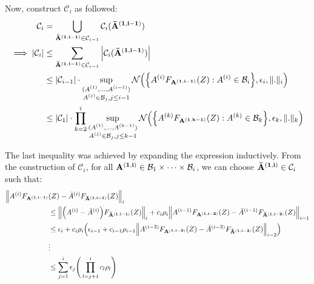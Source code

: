 \begin{proof*}
    \noindent Now, construct $\mathcal{C}_i$ as followed:
    \begin{align*}
        \mathcal{C}_i 
            &= \bigcup_{{\bf {\bar A}^{(1, i-1)}}\in\mathcal{C}_{i-1}} \mathcal{C}_i({\bf {\bar A}^{(1, i-1)}}) \\
        \implies
        |\mathcal{C}_i| 
            &\le \sum_{{\bf {\bar A}^{(1, i-1)}}\in\mathcal{C}_{i-1}} \Big| \mathcal{C}_i({\bf {\bar A}^{(1, i-1)}}) \Big| \\
            &\le |\mathcal{C}_{i-1}| \cdot \sup_{
                \substack{
                    (A^{(1)}, \dots, A^{(i-1)})\\
                    A^{(j)}\in\mathcal{B}_j, j \le i-1
                }
            } \mathcal{N}\Big( 
                \Big\{ 
                    A^{(i)}F_{\bf A^{(1, i-1)}}(Z) : A^{(i)} \in \mathcal{B}_i
                 \Big\}, \epsilon_i, \|.\|_i
             \Big) \\
            &\le |\mathcal{C}_1|\cdot \prod_{k=2}^i \sup_{
                \substack{
                    (A^{(1)}, \dots, A^{(k-1)})\\
                    A^{(j)}\in\mathcal{B}_j, j \le k-1
                }
            } \mathcal{N}\Big( 
                \Big\{ 
                    A^{(k)}F_{\bf A^{(1, k-1)}}(Z) : A^{(k)} \in \mathcal{B}_k
                 \Big\}, \epsilon_k, \|.\|_k
             \Big)
    \end{align*}

    \noindent The last inequality was achieved by expanding the expression inductively. From the construction of $\mathcal{C}_i$, for all ${\bf A^{(1, i)}}\in\mathcal{B}_1\times\dots\times\mathcal{B}_i$, we can choose ${\bf {\bar A}^{(1, i)}}\in\mathcal{C}_i$ such that:
    \begin{align*}
        \Big\|
            A^{(i)}F_{\bf A^{(1, i-1)}}&(Z) - {\bar A}^{(i)}F_{\bf {\bar A}^{(1, i-1)}}(Z)
        \Big\|_i \\
            &\le \Big\|\Big( A^{(i)} - {\bar A}^{(i)} \Big)F_{\bf {\bar A}^{(1, i-1)}}(Z) \Big\|_i 
            + c_i\rho_i\Big\| A^{(i-1)}F_{\bf A^{(1, i-2)}}(Z) - {\bar A}^{(i-1)}F_{\bf {\bar A}^{(1, i-2)}}(Z) \Big\|_{i-1} \\
            &\le \epsilon_i + c_i\rho_i \Big( 
                \epsilon_{i-1} + c_{i-1}\rho_{i-1}\Big\| A^{(i-2)}F_{\bf A^{(1, i-3)}}(Z) - {\bar A}^{(i-2)}F_{\bf {\bar A}^{(1, i-3)}}(Z) \Big\|_{i-2}
             \Big) \\
            &\vdots \\
            &\le \sum_{j=1}^i\epsilon_j \Bigg( 
                \prod_{l=j+1}^i c_l\rho_l
             \Bigg)
    \end{align*} 



\end{proof*}
